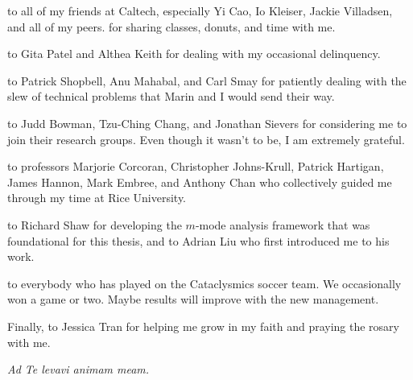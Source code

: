 \documentclass[12pt]{caltech_thesis}
\begin{document}
\begin{acknowledgements}
    \Ty to all of my friends at Caltech, especially Yi Cao, Io Kleiser, Jackie Villadsen, and all of
    my peers. \Ty for sharing classes, donuts, and time with me.

    \Ty to Gita Patel and Althea Keith for dealing with my occasional delinquency.

    \Ty to Patrick Shopbell, Anu Mahabal, and Carl Smay for patiently dealing with the slew of
    technical problems that Marin and I would send their way.

    \Ty to Judd Bowman, Tzu-Ching Chang, and Jonathan Sievers for considering me to join their
    research groups. Even though it wasn't to be, I am extremely grateful.

    \Ty to professors Marjorie Corcoran, Christopher Johns-Krull, Patrick Hartigan, James
    Hannon, Mark Embree, and Anthony Chan who collectively guided me through my time at Rice
    University.

    \Ty to Richard Shaw for developing the $m$-mode analysis framework that was foundational for
    this thesis, and to Adrian Liu who first introduced me to his work.

    \Ty to everybody who has played on the Cataclysmics soccer team. We occasionally won a game or
    two. Maybe results will improve with the new management.

    Finally, \ty to Jessica Tran for helping me grow in my faith and praying the rosary with me.

    \textit{Ad Te levavi animam meam.}

\end{acknowledgements}
\end{document}
